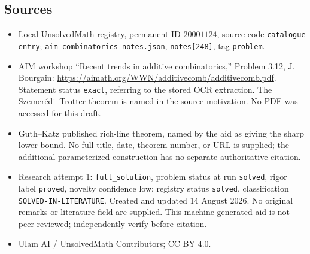 \documentclass[11pt]{article}
\begin{document}
\subsection{Sources}
\begin{itemize}
\item Local UnsolvedMath registry, permanent ID \(20001124\), source code \texttt{catalogue entry}; \texttt{aim-combinatorics-notes.json}, \texttt{notes[248]}, tag \texttt{problem}.
\item AIM workshop ``Recent trends in additive combinatorics,'' Problem 3.12, J. Bourgain: \url{https://aimath.org/WWN/additivecomb/additivecomb.pdf}. Statement status \texttt{exact}, referring to the stored OCR extraction. The Szemer\'edi--Trotter theorem is named in the source motivation. No PDF was accessed for this draft.
\item Guth--Katz published rich-line theorem, named by the aid as giving the sharp lower bound. No full title, date, theorem number, or URL is supplied; the additional parameterized construction has no separate authoritative citation.
\item Research attempt 1: \texttt{full\_solution}, problem status at run \texttt{solved}, rigor label \texttt{proved}, novelty confidence low; registry status \texttt{solved}, classification \texttt{SOLVED-IN-LITERATURE}. Created and updated 14 August 2026. No original remarks or literature field are supplied. This machine-generated aid is not peer reviewed; independently verify before citation.
\item Ulam AI / UnsolvedMath Contributors; CC BY 4.0.
\end{itemize}
\end{document}

